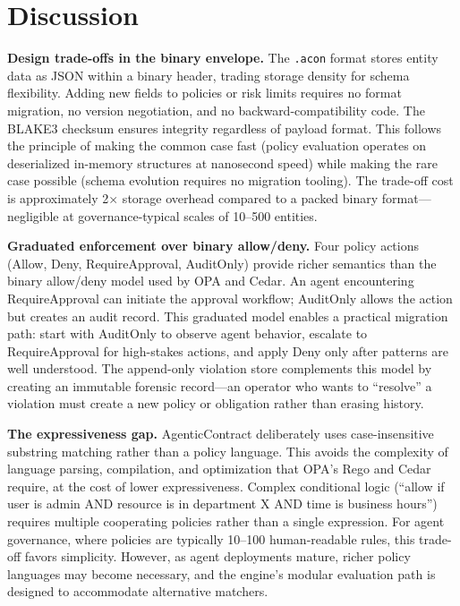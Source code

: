 \documentclass[10pt, twocolumn]{article}
\begin{document}
\section{Discussion}
\label{sec:discussion}

\textbf{Design trade-offs in the binary envelope.} The \texttt{.acon} format stores entity data as JSON within a binary header, trading storage density for schema flexibility. Adding new fields to policies or risk limits requires no format migration, no version negotiation, and no backward-compatibility code. The BLAKE3 checksum ensures integrity regardless of payload format. This follows the principle of making the common case fast (policy evaluation operates on deserialized in-memory structures at nanosecond speed) while making the rare case possible (schema evolution requires no migration tooling). The trade-off cost is approximately 2$\times$ storage overhead compared to a packed binary format---negligible at governance-typical scales of 10--500 entities.

\textbf{Graduated enforcement over binary allow/deny.} Four policy actions (Allow, Deny, RequireApproval, AuditOnly) provide richer semantics than the binary allow/deny model used by OPA and Cedar. An agent encountering RequireApproval can initiate the approval workflow; AuditOnly allows the action but creates an audit record. This graduated model enables a practical migration path: start with AuditOnly to observe agent behavior, escalate to RequireApproval for high-stakes actions, and apply Deny only after patterns are well understood. The append-only violation store complements this model by creating an immutable forensic record---an operator who wants to ``resolve'' a violation must create a new policy or obligation rather than erasing history.

\textbf{The expressiveness gap.} AgenticContract deliberately uses case-insensitive substring matching rather than a policy language. This avoids the complexity of language parsing, compilation, and optimization that OPA's Rego and Cedar require, at the cost of lower expressiveness. Complex conditional logic (``allow if user is admin AND resource is in department X AND time is business hours'') requires multiple cooperating policies rather than a single expression. For agent governance, where policies are typically 10--100 human-readable rules, this trade-off favors simplicity. However, as agent deployments mature, richer policy languages may become necessary, and the engine's modular evaluation path is designed to accommodate alternative matchers.
\end{document}

